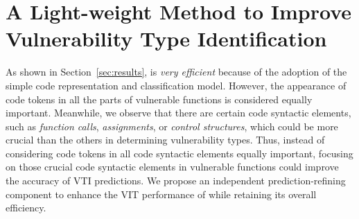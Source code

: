 \section{A Light-weight Method to Improve Vulnerability Type Identification}
\label{sec:our_approach}





As shown in Section~\ref{sec:results}, \base is \textit{very efficient} because of the adoption of the simple code representation and classification model. However, the appearance of code tokens in all the parts of vulnerable functions is considered equally important. 
%
Meanwhile, we observe that there are certain code syntactic elements, such as \textit{function calls}, \textit{assignments}, or \textit{control structures}, which could be more crucial than the others in determining vulnerability types. 
%
%
Thus, instead of considering code tokens in all code syntactic elements equally important, focusing on those crucial code syntactic elements in vulnerable functions could improve the accuracy of VTI predictions.
%
We propose an independent prediction-refining component to enhance the VIT performance of \base while retaining its overall efficiency.





